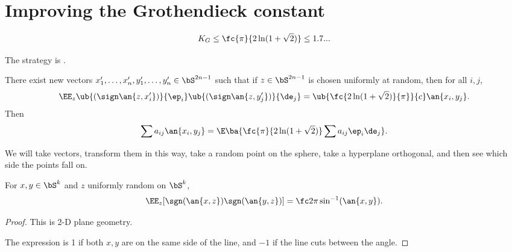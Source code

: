 


\section{Improving the Grothendieck constant}
\begin{thm}[Krivine (1977)]
\[
K_G \le \fc{\pi}{2\ln(1+\sqrt 2)}\le 1.7...
\]
\end{thm}
The strategy is .  


There exist new vectors $x_1',\ldots, x_n',y_1',\ldots, y_n'\in \bS^{2n-1}$ such that if $z\in \bS^{2n-1}$ is chosen uniformly at random, then  for all $i,j$,
\[
\EE_z\ub{(\sign\an{z,x_i'})}{\ep_i} \ub{(\sign\an{z,y_j'})}{\de_j} = \ub{\fc{2\ln(1+\sqrt 2)}{\pi}}{c}\an{x_i,y_j}.
\]
Then
\[
\sum a_{ij} \an{x_i,y_j} = \E \ba{\fc{\pi}{2\ln (1+\sqrt 2)} \sum a_{ij}\ep_i\de_j}.
\]

We will take vectors, transform them in this way, take a random point on the sphere, take a hyperplane orthogonal, and then see which side the points fall on. 

\begin{thm}
For $x,y\in \bS^k$ and $z$ uniformly random on $\bS^k$,
\[
\EE_z[\sgn(\an{x,z}) \sgn(\an{y,z})] = \fc 2\pi \sin^{-1}(\an{x,y}).
\]
\end{thm}
\begin{proof}
This is 2-D plane geometry. 

The expression is 1 if both $x,y$ are on the same side of the line, and $-1$ if the line cuts between the angle. 
\end{proof}


